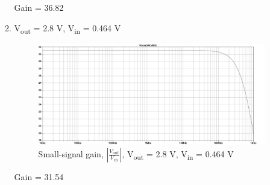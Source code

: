 \documentclass{article}
\begin{document}
\begin{enumerate}[(a)]
\begin{enumerate}[1.]
Gain = 36.82

\item V\textsubscript{out} = 2.8 V, V\textsubscript{in} = 0.464 V
\begin{figure}[H]
\centering
\includegraphics[width=.9\linewidth]{img/q4/e2.pdf}
\caption{\label{fig:gain-q4-e2}Small-signal gain, \(|\frac{V_{out}}{V_{in}}|\), V\textsubscript{out} = 2.8 V, V\textsubscript{in} = 0.464 V}
\end{figure}

Gain = 31.54
\end{enumerate}
\end{enumerate}
\end{document}
